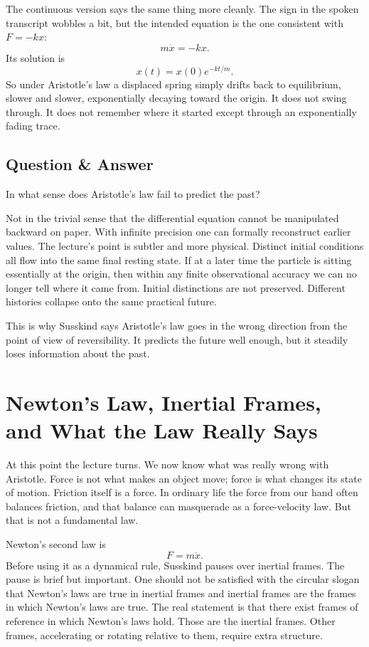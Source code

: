 The continuous version says the same thing more cleanly. The sign in the spoken transcript wobbles a bit, but the intended equation is the one consistent with \(F=-kx\):
\begin{equation}
m\dot x=-kx.
\end{equation}
Its solution is
\begin{equation}
x(t)=x(0)e^{-kt/m}.
\end{equation}
So under Aristotle's law a displaced spring simply drifts back to equilibrium, slower and slower, exponentially decaying toward the origin. It does not swing through. It does not remember where it started except through an exponentially fading trace.

\subsection{Question \& Answer}

In what sense does Aristotle's law fail to predict the past?

Not in the trivial sense that the differential equation cannot be manipulated backward on paper. With infinite precision one can formally reconstruct earlier values. The lecture's point is subtler and more physical. Distinct initial conditions all flow into the same final resting state. If at a later time the particle is sitting essentially at the origin, then within any finite observational accuracy we can no longer tell where it came from. Initial distinctions are not preserved. Different histories collapse onto the same practical future.

This is why Susskind says Aristotle's law goes in the wrong direction from the point of view of reversibility. It predicts the future well enough, but it steadily loses information about the past.

\section{Newton's Law, Inertial Frames, and What the Law Really Says}

At this point the lecture turns. We now know what was really wrong with Aristotle. Force is not what makes an object move; force is what changes its state of motion. Friction itself is a force. In ordinary life the force from our hand often balances friction, and that balance can masquerade as a force-velocity law. But that is not a fundamental law.

Newton's second law is
\begin{equation}
F=m\ddot x.
\end{equation}
Before using it as a dynamical rule, Susskind pauses over inertial frames. The pause is brief but important. One should not be satisfied with the circular slogan that Newton's laws are true in inertial frames and inertial frames are the frames in which Newton's laws are true. The real statement is that there exist frames of reference in which Newton's laws hold. Those are the inertial frames. Other frames, accelerating or rotating relative to them, require extra structure.


